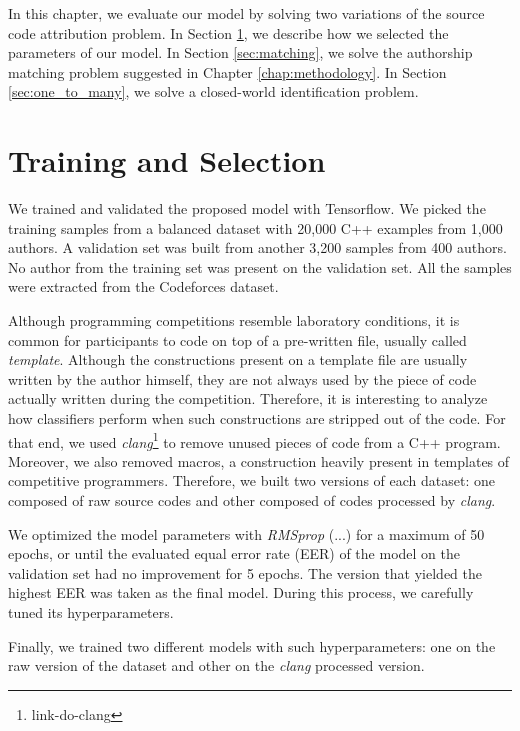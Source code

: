 \label{chap:evaluation}

In this chapter, we evaluate our model by solving two variations of the source code attribution problem. In Section \ref{sec:validation}, we describe how we selected the parameters of our model. In Section \ref{sec:matching}, we solve the authorship matching problem suggested in Chapter \ref{chap:methodology}. In Section \ref{sec:one_to_many}, we solve a closed-world identification problem.

\section{Training and Selection}\label{sec:validation}

We trained and validated the proposed model with Tensorflow. We picked the training samples from a balanced dataset with 20,000 C++ examples from 1,000 authors. A validation set was built from another 3,200 samples from 400 authors. No author from the training set was present on the validation set. All the samples were extracted from the Codeforces dataset.

Although programming competitions resemble laboratory conditions, it is common for participants to code on top of a pre-written file, usually called \textit{template}. Although the constructions present on a template file are usually written by the author himself, they are not always used by the piece of code actually written during the competition. Therefore, it is interesting to analyze how classifiers perform when such constructions are stripped out of the code. For that end, we used \textit{clang}\footnote{link-do-clang} to remove unused pieces of code from a C++ program. Moreover, we also removed macros, a construction heavily present in templates of competitive programmers. Therefore, we built two versions of each dataset: one composed of raw source codes and other composed of codes processed by \textit{clang}.

We optimized the model parameters with \textit{RMSprop} (...) for a maximum of 50 epochs, or until the evaluated equal error rate (EER) of the model on the validation set had no improvement for 5 epochs. The version that yielded the highest EER was taken as the final model. During this process, we carefully tuned its hyperparameters.

Finally, we trained two different models with such hyperparameters: one on the raw version of the dataset and other on the \textit{clang} processed version.

